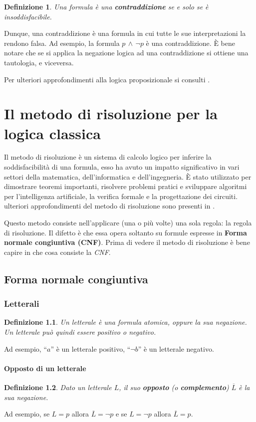 \documentclass[a4paper,12pt]{report}
\newtheorem{definition}{Definizione}[section]
\begin{document}
\begin{definition}
    Una formula è una \textbf{contraddizione} se e solo se è insoddisfacibile.
\end{definition}
Dunque, una contraddizione è una formula in cui tutte le sue interpretazioni la rendono falsa. Ad esempio, la formula $p \, \land \, \lnot p$ è una contraddizione. \`E bene notare che se si applica la negazione logica ad una contraddizione si ottiene una tautologia, e viceversa.

Per ulteriori approfondimenti alla logica proposizionale si consulti \cite{logica_prop}.

% 
% 
\chapter{Il metodo di risoluzione per la logica classica}
\label{resol}
Il metodo di risoluzione è un sistema di calcolo logico per inferire la soddisfacibilità di una formula, esso ha avuto un impatto significativo in vari settori della matematica, dell'informatica e dell'ingegneria. È stato utilizzato per dimostrare teoremi importanti, risolvere problemi pratici e sviluppare algoritmi per l'intelligenza artificiale, la verifica formale e la progettazione dei circuiti. ulteriori approfondimenti del metodo di risoluzione sono presenti in \cite{res_calculus}.

Questo metodo consiste nell'applicare (una o più volte) una sola regola: la regola di risoluzione. Il difetto è che essa opera soltanto su formule espresse in \textbf{Forma normale congiuntiva (CNF)}. Prima di vedere il metodo di risoluzione è bene capire in che cosa consiste la \emph{CNF}.

\section{Forma normale congiuntiva}
\label{CNF}
\subsection{Letterali}

\begin{definition}
    Un letterale è una formula atomica, oppure la sua negazione. Un letterale può quindi essere positivo o negativo.
\end{definition}
Ad esempio, ``$a$'' è un letterale positivo, ``$\lnot b$'' è un letterale negativo.

\subsubsection{Opposto di un letterale}
\begin{definition}
    Dato un letterale $L$, il suo \textbf{opposto} (o \textbf{complemento}) $\overline{L}$ è la sua negazione.
\end{definition}
Ad esempio, se $L = p$ allora $\overline{L} = \lnot p$ e se $L = \lnot p$ allora $\overline{L} = p$.
\end{document}

